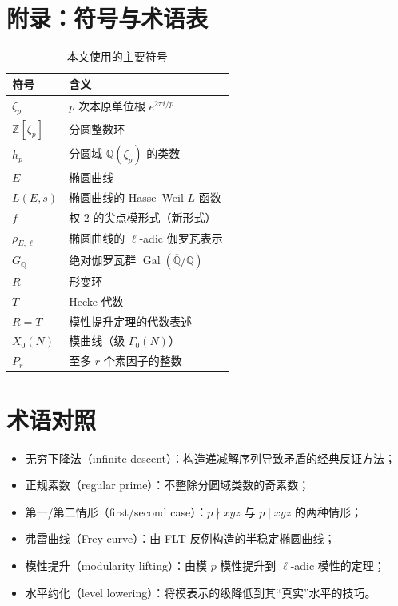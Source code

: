 \section{附录：符号与术语表}\label{sec:appendix}

\begin{table}[htbp]
    \centering
    \caption{本文使用的主要符号}
    \label{tab:notation}
    \begin{tabular}{ll}
        \toprule
        符号 & 含义 \\
        \midrule
        $\zeta_p$ & $p$ 次本原单位根 $e^{2\pi i/p}$ \\
        $\mathbb{Z}[\zeta_p]$ & 分圆整数环 \\
        $h_p$ & 分圆域 $\mathbb{Q}(\zeta_p)$ 的类数 \\
        $E$ & 椭圆曲线 \\
        $L(E, s)$ & 椭圆曲线的 Hasse--Weil $L$ 函数 \\
        $f$ & 权 $2$ 的尖点模形式（新形式） \\
        $\rho_{E,\ell}$ & 椭圆曲线的 $\ell$-adic 伽罗瓦表示 \\
        $G_{\mathbb{Q}}$ & 绝对伽罗瓦群 $\operatorname{Gal}(\overline{\mathbb{Q}}/\mathbb{Q})$ \\
        $R$ & 形变环 \\
        $T$ & Hecke 代数 \\
        $R = T$ & 模性提升定理的代数表述 \\
        $X_0(N)$ & 模曲线（级 $\Gamma_0(N)$） \\
        $P_r$ & 至多 $r$ 个素因子的整数 \\
        \bottomrule
    \end{tabular}
\end{table}

\section*{术语对照}
\begin{itemize}
    \item 无穷下降法（infinite descent）：构造递减解序列导致矛盾的经典反证方法；
    \item 正规素数（regular prime）：不整除分圆域类数的奇素数；
    \item 第一/第二情形（first/second case）：$p \nmid xyz$ 与 $p \mid xyz$ 的两种情形；
    \item 弗雷曲线（Frey curve）：由 FLT 反例构造的半稳定椭圆曲线；
    \item 模性提升（modularity lifting）：由模 $p$ 模性提升到 $\ell$-adic 模性的定理；
    \item 水平约化（level lowering）：将模表示的级降低到其“真实”水平的技巧。
\end{itemize}
